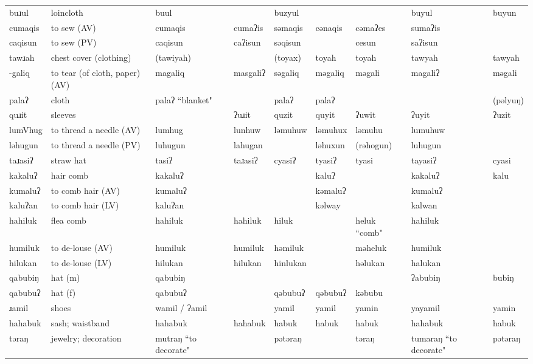 \begin{landscape}
\begin{longtable}{*{9}{p{}}}
\text{*}buɹul & loincloth & buul &  & buzyul &  &  & buyul & buyun\\
\text{*}cumaqis & to sew (AV) & cumaqis & cumaʔis & səmaqis & cənaqis & cəmaʔes & sumaʔis & \\
\text{*}caqisun & to sew (PV) & caqisun & caʔisun & səqisun &  & cesun & saʔisun & \\
\text{*}tawɹah & chest cover (clothing) & (tawiyah) &  & (toyax) & toyah & toyah & tawyah & tawyah\\
\text{*}-galiq & to tear (of cloth, paper) (AV) & magaliq & masgaliʔ & səgaliq & məgaliq & məgali & magaliʔ & məgali\\
\text{*}palaʔ & cloth & palaʔ ``blanket" &  & palaʔ & palaʔ &  &  & (pəlyuŋ)\\
\text{*}quɹit & sleeves &  & ʔuɹit & quzit & quyit & ʔuwit & ʔuyit & ʔuzit\\
\text{*}lumVhug & to thread a needle (AV) & lumhug & lunhuw & ləmuhuw & ləmuhux & ləmuhu & lumuhuw & \\
\text{*}ləhugun & to thread a needle (PV) & luhugun & lahugan &  & ləhuxun & (rəhogun) & luhugun & \\
\text{*}taɹasiʔ & straw hat & tasiʔ & taɹasiʔ & cyasiʔ & tyasiʔ & tyasi & tayasiʔ & cyasi\\
\text{*}kakaluʔ & hair comb & kakaluʔ &  &  & kaluʔ &  & kakaluʔ & kalu\\
\text{*}kumaluʔ & to comb hair (AV) & kumaluʔ &  &  & kəmaluʔ &  & kumaluʔ & \\
\text{*}kaluʔan & to comb hair (LV) & kaluʔan &  &  & kəlway &  & kalwan & \\
\text{*}hahiluk & flea comb & hahiluk & hahiluk & hiluk &  & heluk ``comb" & hahiluk & \\
\text{*}humiluk & to de-louse (AV) & humiluk & humiluk & həmiluk &  & məheluk & humiluk & \\
\text{*}hilukan & to de-louse (LV) & hilukan & hilukan & hinlukan &  & həlukan & halukan & \\
\text{*}qabubiŋ & hat (m) & qabubiŋ &  &  &  &  & ʔabubiŋ & bubiŋ\\
\text{*}qabubuʔ & hat (f) & qabubuʔ &  & qəbubuʔ & qəbubuʔ & kəbubu &  & \\
\text{*}ɹamil & shoes & wamil / ʔamil &  & yamil & yamil & yamin & yayamil & yamin\\
\text{*}hahabuk & sash; waistband & hahabuk & hahabuk & habuk & habuk & habuk & hahabuk & habuk\\
\text{*}təraŋ & jewelry; decoration & mutraŋ ``to decorate" &  & pətəraŋ &  & təraŋ & tumaraŋ ``to decorate" & pətəraŋ\\

\end{longtable}
\end{landscape}
